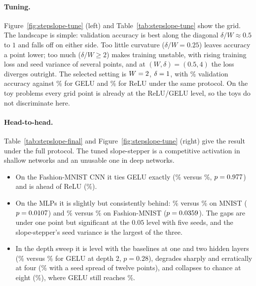 \documentclass[11pt]{article}
\begin{document}
{\paragraph{Tuning.} Figure~\ref{fig:stepslope-tune} (left) and Table~\ref{tab:stepslope-tune} show
the grid. The landscape is simple: validation accuracy is best along the diagonal $\delta/W\approx0.5$
to $1$ and falls off on either side. Too little curvature ($\delta/W=0.25$) leaves accuracy a point
lower; too much ($\delta/W\ge2$) makes training unstable, with rising training loss and seed variance
of several points, and at $(W,\delta)=(0.5,4)$ the loss diverges outright. The selected setting is
$W=2$, $\delta=1$, with \ssBestVal\% validation accuracy against \geluVal\% for GELU
and \reluVal\% for ReLU under the same protocol. On the toy problems every grid point is already at
the ReLU/GELU level, so the toys do not discriminate here.

\paragraph{Head-to-head.} Table~\ref{tab:stepslope-final} and Figure~\ref{fig:stepslope-tune} (right)
give the result under the full protocol. The tuned slope-stepper is a competitive activation in
shallow networks and an unusable one in deep networks.
\begin{itemize}[nosep]
  \item On the Fashion-MNIST CNN it ties GELU exactly (\finalCnnSs\% versus \finalCnnGelu\%,
        $p=0.977$) and is ahead of ReLU (\finalCnnRelu\%).
  \item On the MLPs it is slightly but consistently behind: \finalMnistSs\% versus \finalMnistGelu\%
        on MNIST ($p=0.0107$) and \finalFashionSs\% versus \finalFashionGelu\% on
        Fashion-MNIST ($p=0.0359$). The gaps are under one point but significant at the
        $0.05$ level with five seeds, and the slope-stepper's seed variance is the largest of the three.
  \item In the depth sweep it is level with the baselines at one and two hidden layers
        (\depthSsTwo\% versus \depthGeluTwo\% for GELU at depth 2, $p=0.28$), degrades sharply and erratically at four
        (\depthSsFour\% with a seed spread of twelve points), and collapses to chance at eight
        (\depthSsEight\%), where GELU still reaches \depthGeluEight\%.
\end{itemize}

}
\end{document}
